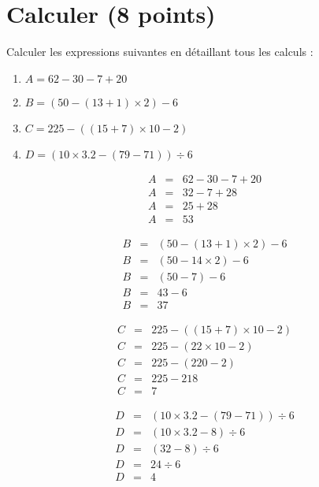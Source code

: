 \section{Calculer (8 points)}


\begin{questions}
	\question[4] Calculer les expressions suivantes en détaillant tous les calculs :
	
	\begin{enumerate}
		\item $A = 62 - 30 - 7 + 20$
		
		\item $B = (50 - (13 + 1) \times 2) - 6$
		
		\item $C= 225 - ((15 + 7) \times 10 - 2)$
		
		\item $D= (10 \times \num{3.2} - (79 - 71)) \div 6$
	\end{enumerate}


	\begin{solution}
		
		\begin{multicols}{2}
			
		\begin{eqnarray*}
			A &=& 62 - 30 - 7 + 20 \\
			A &=& 32 - 7 + 28 \\
			A &=& 25 + 28 \\
			A &=& 53
		\end{eqnarray*}
		
		\begin{eqnarray*}
			B &=& (50 - (13 + 1) \times 2) - 6 \\
			B &=& (50 - 14 \times 2) - 6  \\
			B &=& (50 - 7) - 6  \\
			B &=& 43 - 6  \\
			B &=& 37
		\end{eqnarray*}
		
		\begin{eqnarray*}
			C &=& 225 - ((15 + 7) \times 10 - 2)\\
			C &=& 225 - (22 \times 10 - 2) \\
			C &=& 225 - (220 - 2) \\
			C &=& 225 - 218  \\
			C &=& 7
		\end{eqnarray*}
		
		\begin{eqnarray*}
			D &=& (10 \times \num{3.2} - (79 - 71)) \div 6\\
			D &=& (10 \times \num{3.2} - 8) \div 6 \\
			D &=& (32 - 8) \div 6 \\
			D &=& 24 \div 6  \\
			D &=& 4
		\end{eqnarray*}
		\end{multicols}
	\end{solution}


\end{questions}
